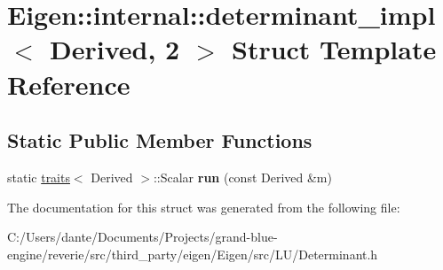 \hypertarget{struct_eigen_1_1internal_1_1determinant__impl_3_01_derived_00_012_01_4}{}\section{Eigen\+::internal\+::determinant\+\_\+impl$<$ Derived, 2 $>$ Struct Template Reference}
\label{struct_eigen_1_1internal_1_1determinant__impl_3_01_derived_00_012_01_4}
\subsection*{Static Public Member Functions}
\begin{DoxyCompactItemize}
\item 
\mbox{\label{struct_eigen_1_1internal_1_1determinant__impl_3_01_derived_00_012_01_4_af60ec7103c3c1d70822a0846d44b8198}} 
static \mbox{\hyperlink{struct_eigen_1_1internal_1_1traits}{traits}}$<$ Derived $>$\+::Scalar {\bfseries run} (const Derived \&m)
\end{DoxyCompactItemize}


The documentation for this struct was generated from the following file\+:\begin{DoxyCompactItemize}
\item 
C\+:/\+Users/dante/\+Documents/\+Projects/grand-\/blue-\/engine/reverie/src/third\+\_\+party/eigen/\+Eigen/src/\+L\+U/Determinant.\+h\end{DoxyCompactItemize}

